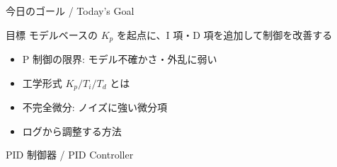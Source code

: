 
\begin{frame}{今日のゴール / Today's Goal}
  \begin{block}{目標}
    モデルベースの $K_p$ を起点に、I 項・D 項を追加して制御を改善する
  \end{block}

  \vspace{0.8em}

  \begin{itemize}
    \item P 制御の限界: モデル不確かさ・外乱に弱い
    \item 工学形式 $K_p / T_i / T_d$ とは
    \item 不完全微分: ノイズに強い微分項
    \item ログから調整する方法
  \end{itemize}
\end{frame}

\begin{frame}{PID 制御器 / PID Controller}
  \begin{center}
    \resizebox{0.78\textwidth}{!}{}
  \end{center}
\end{frame}


